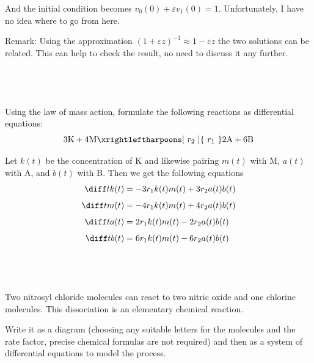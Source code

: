 \documentclass[a4paper]{article}
\begin{document}
And the initial condition becomes $v_0(0) + \varepsilon v_1(0) = 1$. Unfortunately, I have no idea where to go from here.

\vspace{3em}
\begin{questionbody}
Remark: Using the approximation ${(1 + \varepsilon z)}^{-1} \approx 1 - \varepsilon z$ the two solutions can be related. This can help to check the result, no need to discuss it any further.
\end{questionbody}


\subsection{~} %

\begin{questionbody}
Using the law of mass action, formulate the following reactions as differential equations: \[
3\text{K} + 4\text{M} \xrightleftharpoons[\ r_2\ ]{\ r_1\ } 2\text{A} + 6\text{B}
\]
\end{questionbody}

Let $k(t)$ be the concentration of K and likewise pairing $m(t)$ with M, $a(t)$ with A, and $b(t)$ with B. Then we get the following equations \begin{align*}
    \diff t k(t) &= -3 r_1 k(t) m(t) + 3 r_2 a(t) b(t) \\[1ex]
    \diff t m(t) &= -4 r_1 k(t) m(t) + 4 r_2 a(t) b(t) \\[1ex]
    \diff t a(t) &= 2 r_1 k(t) m(t) - 2 r_2 a(t) b(t) \\[1ex]
    \diff t b(t) &= 6 r_1 k(t) m(t) - 6 r_2 a(t) b(t)
\end{align*}

\subsection{~} %

\begin{questionbody}
Two nitrosyl chloride molecules can react to two nitric oxide and one chlorine molecules. This dissociation is an elementary chemical reaction.

Write it as a diagram (choosing any suitable letters for the molecules and the rate factor, precise chemical formulas are not required) and then as a system of differential equations to model the process.
\end{questionbody}
\end{document}
